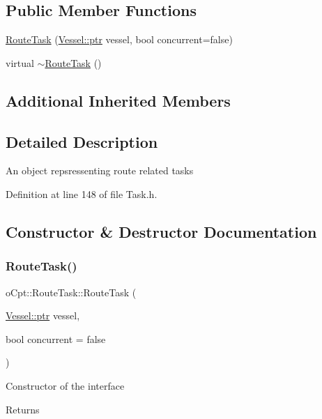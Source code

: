 \subsection*{Public Member Functions}
\begin{DoxyCompactItemize}
\item 
\hyperlink{classo_cpt_1_1_route_task_a94aa6a5ef0a8bf0ef5336ecce356af4c}{Route\+Task} (\hyperlink{classo_cpt_1_1i_vessel_a43711a596f3bdfd0ca732ed3901edc97}{Vessel\+::ptr} vessel, bool concurrent=false)
\item 
virtual \hyperlink{classo_cpt_1_1_route_task_a036b646437996f15a9e74bc12c14aa35}{$\sim$\+Route\+Task} ()
\end{DoxyCompactItemize}
\subsection*{Additional Inherited Members}


\subsection{Detailed Description}
An object repsressenting route related tasks 

Definition at line 148 of file Task.\+h.



\subsection{Constructor \& Destructor Documentation}
\hypertarget{classo_cpt_1_1_route_task_a94aa6a5ef0a8bf0ef5336ecce356af4c}{}\label{classo_cpt_1_1_route_task_a94aa6a5ef0a8bf0ef5336ecce356af4c} 
\subsubsection{\texorpdfstring{Route\+Task()}{RouteTask()}}
{\footnotesize\ttfamily o\+Cpt\+::\+Route\+Task\+::\+Route\+Task (\begin{DoxyParamCaption}\item[{\hyperlink{classo_cpt_1_1i_vessel_a43711a596f3bdfd0ca732ed3901edc97}{Vessel\+::ptr}}]{vessel,  }\item[{bool}]{concurrent = {\ttfamily false} }\end{DoxyParamCaption})}

Constructor of the interface \begin{DoxyReturn}{Returns}

\end{DoxyReturn}


